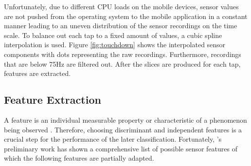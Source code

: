 Unfortunately, due to different CPU loads on the mobile devices, sensor values are not pushed from the operating system to the mobile application in a constant manner leading to an uneven distribution of the sensor recordings on the time scale. To balance out each tap to a fixed amount of values, a cubic spline interpolation is used. Figure \ref{fig:touchdown} shows the interpolated sensor components with dots representing the raw recordings. Furthermore, recordings that are below 75Hz are filtered out. After the slices are produced for each tap, features are extracted.

\subsection{Feature Extraction}
A feature is an individual measurable property or characteristic of a phenomenon being observed \cite{Duda:2000:PC:954544}. Therefore, choosing discriminant and independent features is a crucial step for the performance of the later classification. Fortunately, \citeauthor{Tapprints}'s preliminary work has shown a comprehensive list of possible sensor features of which the following features are partially adapted.

